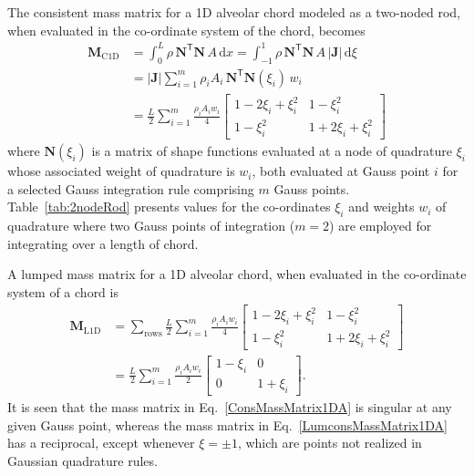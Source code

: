 The consistent mass matrix for a 1D alveolar chord modeled as a two-noded rod, when evaluated in the co-ordinate system of the chord, becomes
\begin{equation} 
\begin{aligned}
\mathbf{M}_{\mathrm{C1D}} & = \int_0^L \rho \, \mathbf{N}^{\mathsf{T}} \mathbf{N} \, A \, \mathrm{d} x  = \int_{-1}^{1} \rho \, \mathbf{N}^{\mathsf{T}} \mathbf{N}\, A \, | \mathbf{J} | \,  \mathrm{d} \xi \\ & 
= | \mathbf{J} | \sum_{i=1}^m  \rho_i A_i  \, \mathbf{N} ^{\mathsf{T}} \mathbf{N}(\xi_i) \, w_i \\ &
= \frac{L}{2} \sum_{i=1}^m \frac{\rho_i A_i w_i}{4} \begin{bmatrix}
1 - 2\xi_i + \xi_i^2 & 1 - \xi_i^2 \\
1 - \xi_i^2 & 1 + 2 \xi_i + \xi_i^2
\end{bmatrix}
\end{aligned}
\label{ConsMassMatrix1DA}
\end{equation}
where $\textbf{N} (\xi_i)$ is a matrix of shape functions evaluated at a node of quadrature $\xi_i$ whose associated weight of quadrature is $w_i$, both evaluated at Gauss point $i$ for a selected Gauss integration rule comprising $m$ Gauss points. Table~\ref{tab:2nodeRod} presents values for the co-ordinates $\xi_i$ and weights $w_i$ of quadrature where two Gauss points of integration ($m=2$) are employed for integrating over a length of chord.  

A lumped mass matrix for a 1D alveolar chord, when evaluated in the co-ordinate system of a chord is 
\begin{equation}
    \begin{aligned}
    \mathbf{M}_{\mathrm{L1D}} & = \sum_{\text{rows}} \frac{L}{2} 
    \sum_{i=1}^m \frac{\rho_i A_i w_i}{4} \begin{bmatrix}
    1 - 2\xi_i + \xi_i^2 & 1 - \xi_i^2 \\
    1 - \xi_i^2 & 1 + 2 \xi_i + \xi_i^2
    \end{bmatrix} \\
    & = \frac{L}{2} \sum_{i=1}^m \frac{\rho_i A_i w_i}{2} \begin{bmatrix} 
    1 - \xi_i & 0 \\ 0 & 1 + \xi_i \end{bmatrix} .
    \end{aligned}
    \label{LumconsMassMatrix1DA}
\end{equation}
It is seen that the mass matrix in Eq.~\ref{ConsMassMatrix1DA} is singular at any given Gauss point, whereas the mass matrix in Eq.~\ref{LumconsMassMatrix1DA} has a reciprocal, except whenever $\xi = \pm 1$, which are points not realized in Gaussian quadrature rules. 

